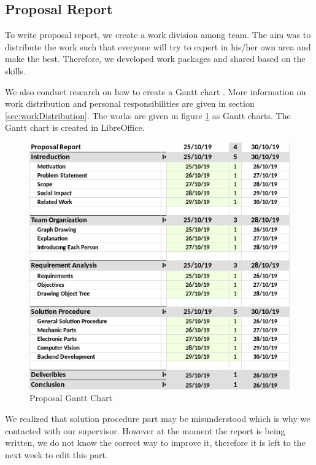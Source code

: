 \subsection{Proposal Report}
To write proposal report, we create a work division among team. The aim was to distribute the work such that everyone will try to expert in his/her own area and make the best. Therefore, we developed work packages and shared based on the skills.

We also conduct research on how to create a Gantt chart \cite{cite:ganttchart}.
More information on work distribution and personal responsibilities are given in section \ref{sec:workDistribution}. The works are given in figure \ref{fig:ganttChart} as Gantt charts. The Gantt chart is created in LibreOffice.

\begin{figure}
    \centering
    \includegraphics[width=\linewidth]{img/proposalGanttChart.png}
    \caption{Proposal Gantt Chart}
    \label{fig:ganttChart}
\end{figure}

We realized that solution procedure part may be misunderstood which is why we contacted with our supervisor. However at the moment the report is being written, we do not know the correct way to improve it, therefore it is left to the next week to edit this part.